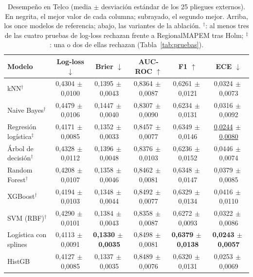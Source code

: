 \documentclass[11pt,a4paper]{article}
\begin{document}
\begin{table}[t]
\centering
\caption{Desempeño en Telco (media $\pm$ desviación estándar de los 25 pliegues externos). En negrita, el mejor valor de cada columna; subrayado, el segundo mejor. Arriba, los once modelos de referencia; abajo, las variantes de la ablación. $^{\dagger}$: al menos tres de las cuatro pruebas de log-loss rechazan frente a RegionalMAPEM tras Holm; $^{\ddagger}$: una o dos de ellas rechazan (Tabla~\ref{tab:pruebas}).}
\label{tab:desempeno}
\footnotesize
\setlength{\tabcolsep}{2pt}
\begin{tabular}{lccccc}
\toprule
Modelo & Log-loss $\downarrow$ & Brier $\downarrow$ & AUC-ROC $\uparrow$ & F1 $\uparrow$ & ECE $\downarrow$ \\
\midrule
kNN$^{\dagger}$ & 0{,}4304$\,\pm\,$0{,}0100 & 0{,}1395$\,\pm\,$0{,}0043 & 0{,}8364$\,\pm\,$0{,}0087 & 0{,}6261$\,\pm\,$0{,}0121 & 0{,}0324$\,\pm\,$0{,}0073 \\
Naive Bayes$^{\dagger}$ & 0{,}4479$\,\pm\,$0{,}0106 & 0{,}1447$\,\pm\,$0{,}0040 & 0{,}8307$\,\pm\,$0{,}0090 & 0{,}6234$\,\pm\,$0{,}0131 & 0{,}0316$\,\pm\,$0{,}0092 \\
Regresión logística$^{\ddagger}$ & 0{,}4171$\,\pm\,$0{,}0085 & 0{,}1352$\,\pm\,$0{,}0033 & 0{,}8457$\,\pm\,$0{,}0077 & 0{,}6349$\,\pm\,$0{,}0146 & \underline{0{,}0244$\,\pm\,$0{,}0080} \\
Árbol de decisión$^{\dagger}$ & 0{,}4328$\,\pm\,$0{,}0112 & 0{,}1396$\,\pm\,$0{,}0048 & 0{,}8376$\,\pm\,$0{,}0103 & 0{,}6236$\,\pm\,$0{,}0152 & 0{,}0446$\,\pm\,$0{,}0074 \\
Random Forest$^{\dagger}$ & 0{,}4208$\,\pm\,$0{,}0107 & 0{,}1358$\,\pm\,$0{,}0046 & 0{,}8462$\,\pm\,$0{,}0081 & 0{,}6348$\,\pm\,$0{,}0147 & 0{,}0379$\,\pm\,$0{,}0085 \\
XGBoost$^{\dagger}$ & 0{,}4194$\,\pm\,$0{,}0103 & 0{,}1348$\,\pm\,$0{,}0044 & 0{,}8492$\,\pm\,$0{,}0077 & 0{,}6329$\,\pm\,$0{,}0134 & 0{,}0416$\,\pm\,$0{,}0110 \\
SVM (RBF)$^{\dagger}$ & 0{,}4290$\,\pm\,$0{,}0101 & 0{,}1384$\,\pm\,$0{,}0043 & 0{,}8358$\,\pm\,$0{,}0087 & 0{,}6272$\,\pm\,$0{,}0093 & 0{,}0322$\,\pm\,$0{,}0086 \\
Logística con splines & 0{,}4113$\,\pm\,$0{,}0091 & \textbf{0{,}1330$\,\pm\,$0{,}0035} & 0{,}8498$\,\pm\,$0{,}0081 & \textbf{0{,}6379$\,\pm\,$0{,}0138} & \textbf{0{,}0243$\,\pm\,$0{,}0057} \\
HistGB & 0{,}4127$\,\pm\,$0{,}0085 & 0{,}1337$\,\pm\,$0{,}0035 & 0{,}8489$\,\pm\,$0{,}0076 & 0{,}6320$\,\pm\,$0{,}0131 & 0{,}0253$\,\pm\,$0{,}0069 \\

\end{tabular}
\end{table}
\end{document}
